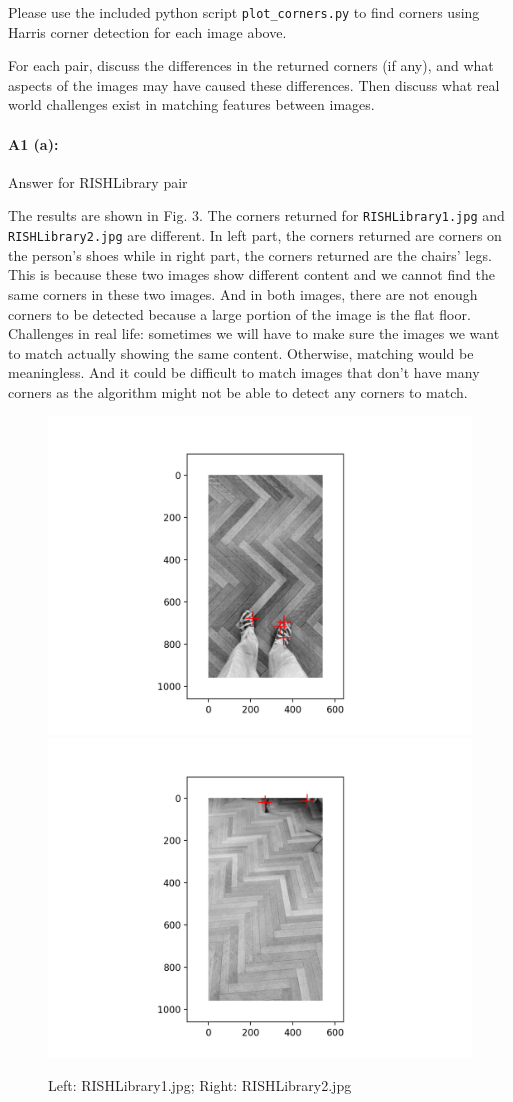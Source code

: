 Please use the included python script \texttt{plot\_corners.py} to find corners using Harris corner detection for each image above.

For each pair, discuss the differences in the returned corners (if any), and what aspects of the images may have caused these differences. Then discuss what real world challenges exist in matching features between images.


\paragraph{A1 (a):} Answer for RISHLibrary pair

The results are shown in Fig. 3. The corners returned for \texttt{RISHLibrary1.jpg} and \texttt{RISHLibrary2.jpg} are different. In left part, the corners returned are corners on the person's shoes while in right part, the corners returned are the chairs' legs. This is because these two images show different content and we cannot find the same corners in these two images. And in both images, there are not enough corners to be detected because a large portion of the image is the flat floor. Challenges in real life: sometimes we will have to make sure the images we want to match actually showing the same content. Otherwise, matching would be meaningless. And it could be difficult to match images that don't have many corners as the algorithm might not be able to detect any corners to match.

\begin{figure}[htbp]
    \centering
    \includegraphics[width=0.49\linewidth]{Q1_RISHLibrary1.png}
    \includegraphics[width=0.49\linewidth]{Q1_RISHLibrary2.png}
    \caption{Left: RISHLibrary1.jpg; Right: RISHLibrary2.jpg}
\end{figure}




